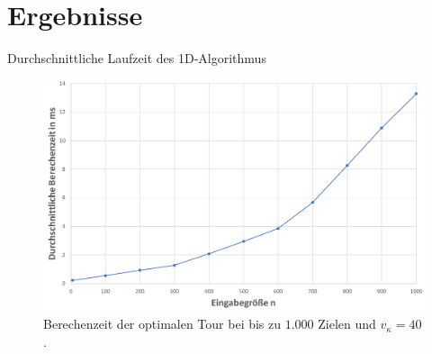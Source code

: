 \documentclass[10pt,table,xcolor=dvipsnames]{beamer}
\begin{document}
\section{Ergebnisse}
\begin{frame}{Durchschnittliche Laufzeit des 1D-Algorithmus}
\centering
\begin{figure}
\includegraphics[scale=0.15]{Images/Exp1D.png}
\caption{Berechenzeit der optimalen Tour bei bis zu $1.000$ Zielen und $v_{\kappa}=40$.}
\end{figure}
\end{frame}
\end{document}
